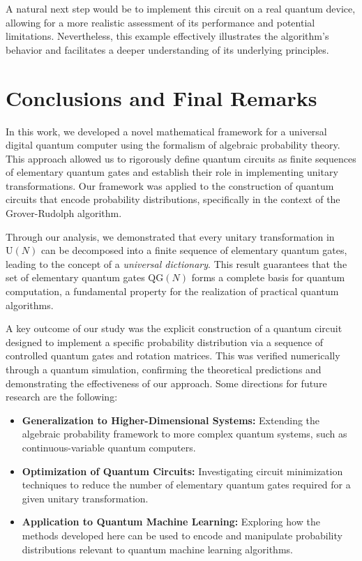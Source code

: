 \documentclass[a4paper,11pt]{article}
\begin{document}
\bigskip

A natural next step would be to implement this circuit on a real quantum device, allowing for a more realistic assessment of its performance and potential limitations. Nevertheless, this example effectively illustrates the algorithm's behavior and facilitates a deeper understanding of its underlying principles.


\section{Conclusions and Final Remarks}\label{Conclusions}

In this work, we developed a novel mathematical framework for a universal digital quantum computer using the formalism of algebraic probability theory. This approach allowed us to rigorously define quantum circuits as finite sequences of elementary quantum gates and establish their role in implementing unitary transformations. Our framework was applied to the construction of quantum circuits that encode probability distributions, specifically in the context of the Grover-Rudolph algorithm.

\bigskip

Through our analysis, we demonstrated that every unitary transformation in \(\mathrm{U}(N)\) can be decomposed into a finite sequence of elementary quantum gates, leading to the concept of a \emph{universal dictionary}. This result guarantees that the set of elementary quantum gates \(\mathrm{QG}(N)\) forms a complete basis for quantum computation, a fundamental property for the realization of practical quantum algorithms.

\bigskip

A key outcome of our study was the explicit construction of a quantum circuit designed to implement a specific probability distribution via a sequence of controlled quantum gates and rotation matrices. This was verified numerically through a quantum simulation, confirming the theoretical predictions and demonstrating the effectiveness of our approach. Some directions for future research are the following:
\begin{itemize}
    \item \textbf{Generalization to Higher-Dimensional Systems:} Extending the algebraic probability framework to more complex quantum systems, such as continuous-variable quantum computers.
    \item \textbf{Optimization of Quantum Circuits:} Investigating circuit minimization techniques to reduce the number of elementary quantum gates required for a given unitary transformation.
    \item \textbf{Application to Quantum Machine Learning:} Exploring how the methods developed here can be used to encode and manipulate probability distributions relevant to quantum machine learning algorithms.
\end{itemize}
\end{document}
